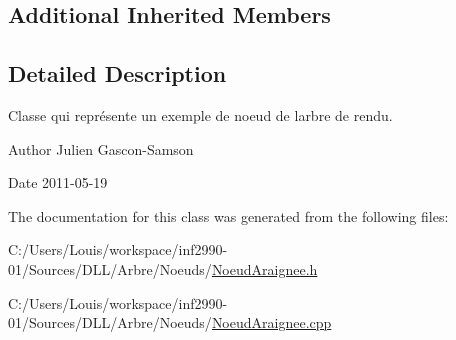 \subsection*{Additional Inherited Members}


\subsection{Detailed Description}
Classe qui représente un exemple de noeud de l\textquotesingle{}arbre de rendu. 

\begin{DoxyAuthor}{Author}
Julien Gascon-\/\+Samson 
\end{DoxyAuthor}
\begin{DoxyDate}{Date}
2011-\/05-\/19 
\end{DoxyDate}


The documentation for this class was generated from the following files\+:\begin{DoxyCompactItemize}
\item 
C\+:/\+Users/\+Louis/workspace/inf2990-\/01/\+Sources/\+D\+L\+L/\+Arbre/\+Noeuds/\hyperlink{_noeud_araignee_8h}{Noeud\+Araignee.\+h}\item 
C\+:/\+Users/\+Louis/workspace/inf2990-\/01/\+Sources/\+D\+L\+L/\+Arbre/\+Noeuds/\hyperlink{_noeud_araignee_8cpp}{Noeud\+Araignee.\+cpp}\end{DoxyCompactItemize}
